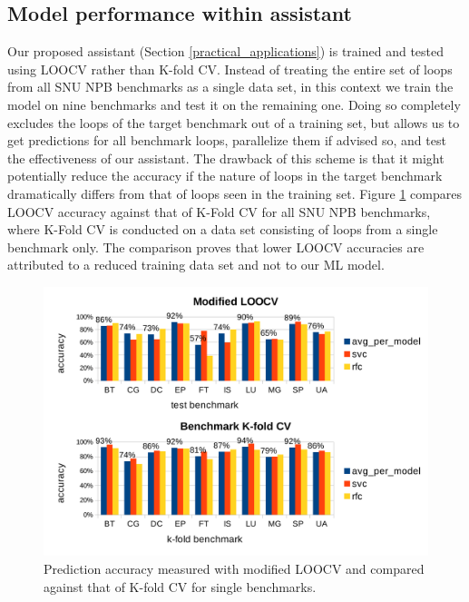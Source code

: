 \subsection{Model performance within assistant}
\label{evaluation_loocv}
\quad Our proposed assistant (Section \ref{practical_applications}) is trained and tested using LOOCV rather than K-fold CV. Instead of treating the entire set of loops from all SNU NPB benchmarks as a single data set, in this context we train the model on nine benchmarks and test it on the remaining one. Doing so completely excludes the loops of the target benchmark out of a training set, but allows us to get predictions for all benchmark loops, parallelize them if advised so, and test the effectiveness of our assistant. The drawback of this scheme is that it might potentially reduce the accuracy if the nature of loops in the target benchmark dramatically differs from that of loops seen in the training set. Figure \ref{fig:accuracy_loocv_vs_kfold} compares LOOCV accuracy against that of K-Fold CV for all SNU NPB benchmarks, where K-Fold CV is conducted on a data set consisting of loops from a single benchmark only. The comparison proves that lower LOOCV accuracies are attributed to a reduced training data set and not to our ML model.
\begin{figure}[ht]
\includegraphics[width=1.0\textwidth]{images/LOOCV_accuracy.pdf}
\caption{Prediction accuracy measured with modified LOOCV and compared against that of K-fold CV for single benchmarks.}
\label{fig:accuracy_loocv_vs_kfold}
\vspace{-5mm}
\end{figure}
